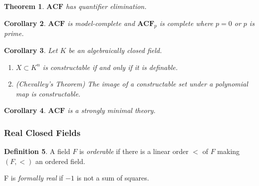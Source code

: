 \documentclass{amsart}
\newtheorem{theorem}{Theorem}[subsection]
\newtheorem{lemma}[theorem]{Lemma}
\newtheorem{corollary}[theorem]{Corollary}
\theoremstyle{definition}
\newtheorem{definition}[theorem]{Definition}
\numberwithin{equation}{section}
\begin{document}

\begin{theorem}
	$\mathbf{ACF}$ has quantifier elimination.
\end{theorem}

\begin{corollary}
	$\mathbf{ACF}$ is model-complete and $\mathbf{ACF}_p$ is complete where $p = 0$ or $p$ is prime.
\end{corollary}



\begin{corollary}
	Let $K$ be an algebraically closed field.
	\begin{enumerate}[label = {\roman*)}]
		\item $X \subset K^n$ is constructable if and only if it is definable.
		\item (Chevalley's Theorem) The image of a constructable set under a polynomial map is constructable.
	\end{enumerate}
\end{corollary}

\begin{corollary}
	$\mathbf{ACF}$ is a strongly minimal theory.
\end{corollary}

\subsubsection{Real Closed Fields}

\begin{definition}
	A field $F$ is \emph{orderable} if there is a linear order $<$ of $F$ making $(F,<)$ an ordered field.

	F is \emph{formally real} if $-1$ is not a sum of squares.
\end{definition}
\end{document}

